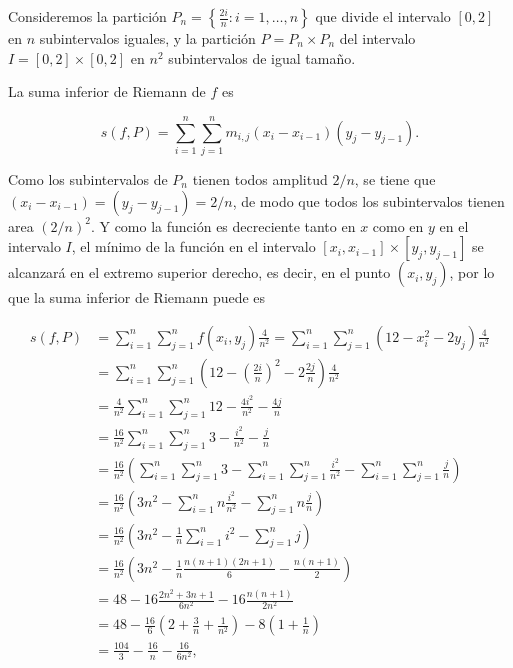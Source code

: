 \documentclass[
  a4paper,
]{scrreport}
\theoremstyle{definition}
\theoremstyle{remark}
\begin{document}
\begin{tcolorbox}[enhanced jigsaw, rightrule=.15mm, opacityback=0, bottomtitle=1mm, titlerule=0mm, toprule=.15mm, breakable, colframe=quarto-callout-tip-color-frame, left=2mm, opacitybacktitle=0.6, title=\textcolor{quarto-callout-tip-color}{\faLightbulb}\hspace{0.5em}{Solución}, toptitle=1mm, colback=white, colbacktitle=quarto-callout-tip-color!10!white, arc=.35mm, bottomrule=.15mm, coltitle=black, leftrule=.75mm]

Consideremos la partición
\(P_n = \left\{\frac{2i}{n}: i=1,\ldots,n\right\}\) que divide el
intervalo \([0,2]\) en \(n\) subintervalos iguales, y la partición
\(P=P_n\times P_n\) del intervalo \(I=[0,2]\times[0,2]\) en \(n^2\)
subintervalos de igual tamaño.

La suma inferior de Riemann de \(f\) es

\[
s(f,P) = \sum_{i=1}^n\sum_{j=1}^n m_{i,j} (x_i-x_{i-1})(y_j-y_{j-1}).
\]

Como los subintervalos de \(P_n\) tienen todos amplitud \(2/n\), se
tiene que \((x_i-x_{i-1}) = (y_j-y_{j-1}) = 2/n\), de modo que todos los
subintervalos tienen area \((2/n)^2\). Y como la función es decreciente
tanto en \(x\) como en \(y\) en el intervalo \(I\), el mínimo de la
función en el intervalo \([x_i,x_{i-1}]\times[y_j,y_{j-1}]\) se
alcanzará en el extremo superior derecho, es decir, en el punto
\((x_i,y_j)\), por lo que la suma inferior de Riemann puede es

\begin{align*}
s(f,P) 
&= \sum_{i=1}^n\sum_{j=1}^n f(x_i,y_j) \frac{4}{n^2}
= \sum_{i=1}^n\sum_{j=1}^n (12-x_i^2-2y_j) \frac{4}{n^2} \\
&= \sum_{i=1}^n\sum_{j=1}^n \left(12-\left(\frac{2i}{n}\right)^2-2\frac{2j}{n}\right) \frac{4}{n^2} \\
&= \frac{4}{n^2} \sum_{i=1}^n\sum_{j=1}^n 12-\frac{4i^2}{n^2}-\frac{4j}{n} \\
&= \frac{16}{n^2} \sum_{i=1}^n\sum_{j=1}^n 3-\frac{i^2}{n^2}-\frac{j}{n} \\
&= \frac{16}{n^2} \left(\sum_{i=1}^n\sum_{j=1}^n 3- \sum_{i=1}^n\sum_{j=1}^n \frac{i^2}{n^2}- \sum_{i=1}^n\sum_{j=1}^n \frac{j}{n}\right) \\
&= \frac{16}{n^2} \left(3n^2 - \sum_{i=1}^n n\frac{i^2}{n^2} - \sum_{j=1}^n n\frac{j}{n}\right) \\
&= \frac{16}{n^2} \left(3n^2 - \frac{1}{n}\sum_{i=1}^n i^2 - \sum_{j=1}^n j\right) \\
&= \frac{16}{n^2} \left(3n^2 - \frac{1}{n}\frac{n(n+1)(2n+1)}{6} - \frac{n(n+1)}{2}\right) \\
&= 48 - 16\frac{2n^2+3n+1}{6n^2} - 16\frac{n(n+1)}{2n^2} \\
&= 48 - \frac{16}{6}\left(2 +\frac{3}{n}+\frac{1}{n^2}\right) - 8\left(1+\frac{1}{n}\right) \\
&= \frac{104}{3} -\frac{16}{n} -\frac{16}{6n^2},
\end{align*}


\end{tcolorbox}
\end{document}
